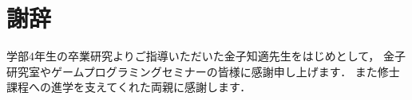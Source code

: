\chapter*{謝辞}
学部$4$年生の卒業研究よりご指導いただいた金子知適先生をはじめとして， 金子研究室やゲームプログラミングセミナーの皆様に感謝申し上げます．
また修士課程への進学を支えてくれた両親に感謝します．